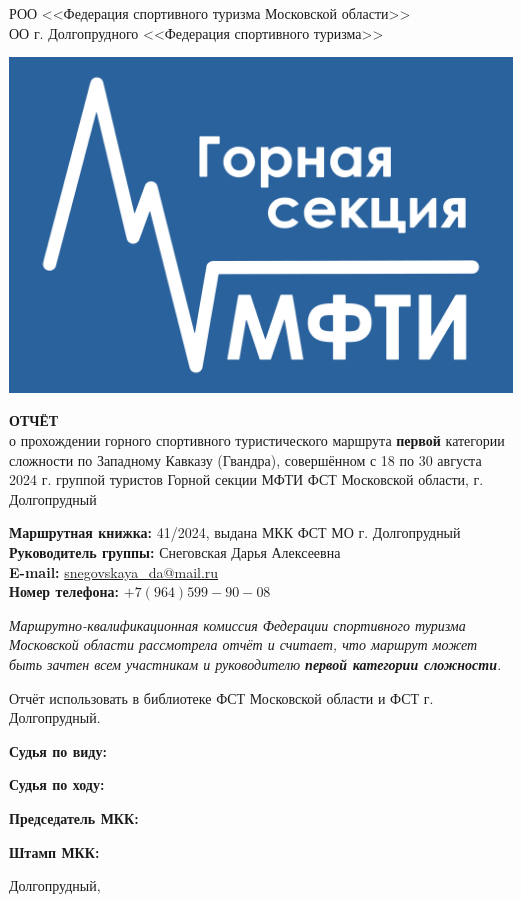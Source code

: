\begin{titlepage}
\setlength\parindent{0pt}
	\begin{center}
		\large{РОО <<Федерация спортивного туризма Московской области>>\\
		ОО г. Долгопрудного <<Федерация спортивного туризма>>\\}
	\end{center}

	


	
	\begin{center}
		\includegraphics[width=0.4\linewidth]{../pics/Flag_GS-2}
		
		\Large{\bfseries{ОТЧЁТ}} \\
		\normalsize о прохождении горного спортивного туристического маршрута \textbf{первой} категории сложности по Западному Кавказу (Гвандра), совершённом с 18 по 30 августа 2024 г. группой туристов Горной секции МФТИ ФСТ Московской области, г. Долгопрудный
	\end{center}
	\vspace{1.5 cm}
	
	\textbf{Маршрутная книжка:} 41/2024, выдана МКК ФСТ МО г. Долгопрудный \\ 
	\textbf{Руководитель группы:} Снеговская Дарья Алексеевна\\
	\textbf{E-mail:} \href{mailto: snegovskaya\_da@mail.ru}{snegovskaya\_da@mail.ru}\\
	\textbf{Номер телефона:} $+7(964)599-90-08$
	
	\vspace{0.2cm}
	
	\textit{Маршрутно-квалификационная комиссия Федерации спортивного туризма Московской области рассмотрела отчёт и считает, что маршрут может быть зачтен всем участникам и руководителю \textbf{первой категории сложности}.}

	\vspace{0.2cm}
	
	Отчёт использовать в библиотеке ФСТ Московской области и ФСТ г. Долгопрудный.
	
	\vspace{1cm}
	\textbf{Судья по виду:} 
	
	\vspace{1cm}
	\textbf{Судья по ходу:}
	
	\vspace{1cm}
	\textbf{Председатель МКК:}
	
	\vspace{1cm}
	\textbf{Штамп МКК:}
	
	\vfill
	\begin{center}
		Долгопрудный,   \the\year{}
	\end{center}
\end{titlepage}
